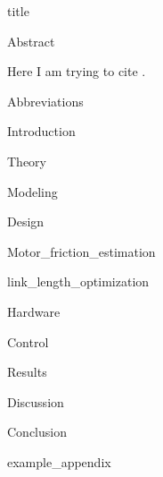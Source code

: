 \documentclass{article}
\begin{document}
{title}

\frontmatter

{Abstract}

Here I am trying to cite \cite{schulman_proximal_2017}.

\newpage
\tableofcontents

\listoffigures
\listoftables

\mainmatter

{Abbreviations}

{Introduction}
\newpage

{Theory}

{Modeling}

{Design}

{Motor_friction_estimation}

{link_length_optimization}

{Hardware}

{Control}


{Results}

{Discussion}

{Conclusion}


\newpage
\printbibliography[heading = bibintoc, title = Bibliography]    %

\addappendix
{example_appendix}

\end{document}
